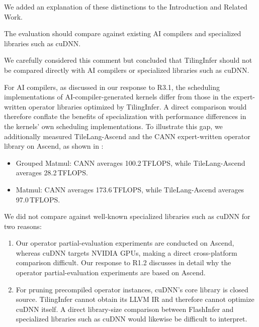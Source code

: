 We added an explanation of these distinctions to the Introduction and Related
Work.


{The evaluation should compare against existing AI compilers and specialized
libraries such as cuDNN.}

\authorresponse
We carefully considered this comment but concluded that TilingInfer should not
be compared directly with AI compilers or specialized libraries such as cuDNN.

For AI compilers, as discussed in our response to R3.1, the scheduling
implementations of AI-compiler-generated kernels differ from those in the
expert-written operator libraries optimized by TilingInfer.  A direct
comparison would therefore conflate the benefits of specialization with
performance differences in the kernels' own scheduling implementations.  To
illustrate this gap, we additionally measured TileLang-Ascend and the CANN
expert-written operator library on Ascend, as shown in
\hyperref[fig:tilelang-cann-roofline]{%
  }:

\begin{itemize}[leftmargin=*,nosep]
  \item Grouped Matmul: CANN averages 100.2\,TFLOPS, while TileLang-Ascend
  averages 28.2\,TFLOPS.
  \item Matmul: CANN averages 173.6\,TFLOPS, while TileLang-Ascend averages
  97.0\,TFLOPS.
\end{itemize}

We did not compare against well-known specialized libraries such as cuDNN for
two reasons:

\begin{enumerate}[label=(\arabic*),leftmargin=*,nosep]
  \item Our operator partial-evaluation experiments are conducted on Ascend,
  whereas cuDNN targets NVIDIA GPUs, making a direct cross-platform comparison
  difficult.  Our response to R1.2 discusses in detail why the operator
  partial-evaluation experiments are based on Ascend.

  \item For pruning precompiled operator instances, cuDNN's core library is
  closed source.  TilingInfer cannot obtain its LLVM IR and therefore cannot
  optimize cuDNN itself.  A direct library-size comparison between FlashInfer
  and specialized libraries such as cuDNN would likewise be difficult to
  interpret.
\end{enumerate}

